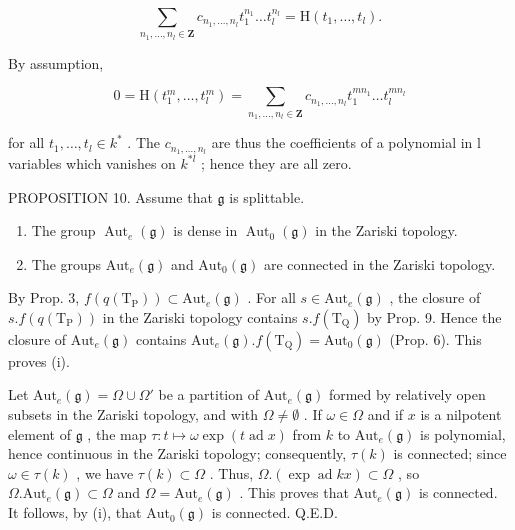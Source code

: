 \[
\sum_ {n _ {1}, \dots , n _ {l} \in \mathbf {Z}} c _ {n _ {1}, \dots , n _ {l}} t _ {1} ^ {n _ {1}} \dots t _ {l} ^ {n _ {l}} = \mathrm{H} (t _ {1}, \dots , t _ {l}).
\]

By assumption,

\[
0 = \mathrm{H} (t _ {1} ^ {m}, \dots , t _ {l} ^ {m}) = \sum_ {n _ {1}, \dots , n _ {l} \in \mathbf {Z}} c _ {n _ {1}, \dots , n _ {l}} t _ {1} ^ {m n _ {1}} \dots t _ {l} ^ {m n _ {l}}
\]

for all \(t_{1},\ldots,t_{l}\in k^{*}\) . The \(c_{n_{1},\ldots,n_{l}}\) are thus the coefficients of a polynomial in l variables which vanishes on \(k^{*l}\) ; hence they are all zero.

PROPOSITION 10. Assume that \(\mathfrak{g}\) is splittable.

\begin{enumerate}
\def\labelenumi{(\roman{enumi})}
\item
  The group \(\operatorname{Aut}_{e}(\mathfrak{g})\) is dense in \(\operatorname{Aut}_{0}(\mathfrak{g})\) in the Zariski topology.
\item
  The groups \(\mathrm{Aut}_e(\mathfrak{g})\) and \(\mathrm{Aut}_0(\mathfrak{g})\) are connected in the Zariski topology.
\end{enumerate}

By Prop. 3, \(f(q(\mathrm{T}_{\mathrm{P}})) \subset \mathrm{Aut}_e(\mathfrak{g})\) . For all \(s \in \mathrm{Aut}_e(\mathfrak{g})\) , the closure of \(s.f(q(\mathrm{T}_{\mathrm{P}}))\) in the Zariski topology contains \(s.f(\mathrm{T}_{\mathrm{Q}})\) by Prop. 9. Hence the closure of \(\mathrm{Aut}_e(\mathfrak{g})\) contains \(\mathrm{Aut}_e(\mathfrak{g}).f(\mathrm{T}_{\mathrm{Q}}) = \mathrm{Aut}_0(\mathfrak{g})\) (Prop. 6). This proves (i).

Let \(\mathrm{Aut}_e(\mathfrak{g}) = \Omega \cup \Omega'\) be a partition of \(\mathrm{Aut}_e(\mathfrak{g})\) formed by relatively open subsets in the Zariski topology, and with \(\Omega \neq \emptyset\) . If \(\omega \in \Omega\) and if \(x\) is a nilpotent element of \(\mathfrak{g}\) , the map \(\tau : t \mapsto \omega \exp(t \operatorname{ad} x)\) from \(k\) to \(\mathrm{Aut}_e(\mathfrak{g})\) is polynomial, hence continuous in the Zariski topology; consequently, \(\tau(k)\) is connected; since \(\omega \in \tau(k)\) , we have \(\tau(k) \subset \Omega\) . Thus, \(\Omega. (\exp \operatorname{ad} kx) \subset \Omega\) , so \(\Omega. \mathrm{Aut}_e(\mathfrak{g}) \subset \Omega\) and \(\Omega = \mathrm{Aut}_e(\mathfrak{g})\) . This proves that \(\mathrm{Aut}_e(\mathfrak{g})\) is connected. It follows, by (i), that \(\mathrm{Aut}_0(\mathfrak{g})\) is connected. Q.E.D.

